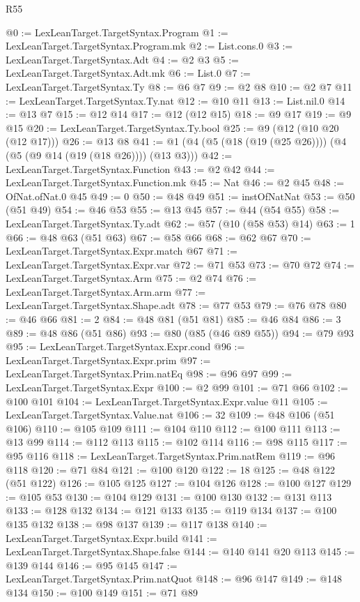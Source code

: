 \begin{lexlean}{R55}
\begin{coremodule}
@0 := LexLeanTarget.TargetSyntax.Program
@1 := LexLeanTarget.TargetSyntax.Program.mk
@2 := List.cons.{0}
@3 := LexLeanTarget.TargetSyntax.Adt
@4 := @2 @3
@5 := LexLeanTarget.TargetSyntax.Adt.mk
@6 := List.{0}
@7 := LexLeanTarget.TargetSyntax.Ty
@8 := @6 @7
@9 := @2 @8
@10 := @2 @7
@11 := LexLeanTarget.TargetSyntax.Ty.nat
@12 := @10 @11
@13 := List.nil.{0}
@14 := @13 @7
@15 := @12 @14
@17 := @12 (@12 @15)
@18 := @9 @17
@19 := @9 @15
@20 := LexLeanTarget.TargetSyntax.Ty.bool
@25 := @9 (@12 (@10 @20 (@12 @17)))
@26 := @13 @8
@41 := @1 (@4 (@5 (@18 (@19 (@25 @26)))) (@4 (@5 (@9 @14 (@19 (@18 @26)))) (@13 @3)))
@42 := LexLeanTarget.TargetSyntax.Function
@43 := @2 @42
@44 := LexLeanTarget.TargetSyntax.Function.mk
@45 := Nat
@46 := @2 @45
@48 := OfNat.ofNat.{0} @45
@49 := 0
@50 := @48 @49
@51 := instOfNatNat
@53 := @50 (@51 @49)
@54 := @46 @53
@55 := @13 @45
@57 := @44 (@54 @55)
@58 := LexLeanTarget.TargetSyntax.Ty.adt
@62 := @57 (@10 (@58 @53) @14)
@63 := 1
@66 := @48 @63 (@51 @63)
@67 := @58 @66
@68 := @62 @67
@70 := LexLeanTarget.TargetSyntax.Expr.match @67
@71 := LexLeanTarget.TargetSyntax.Expr.var
@72 := @71 @53
@73 := @70 @72
@74 := LexLeanTarget.TargetSyntax.Arm
@75 := @2 @74
@76 := LexLeanTarget.TargetSyntax.Arm.arm
@77 := LexLeanTarget.TargetSyntax.Shape.adt
@78 := @77 @53
@79 := @76 @78
@80 := @46 @66
@81 := 2
@84 := @48 @81 (@51 @81)
@85 := @46 @84
@86 := 3
@89 := @48 @86 (@51 @86)
@93 := @80 (@85 (@46 @89 @55))
@94 := @79 @93
@95 := LexLeanTarget.TargetSyntax.Expr.cond
@96 := LexLeanTarget.TargetSyntax.Expr.prim
@97 := LexLeanTarget.TargetSyntax.Prim.natEq
@98 := @96 @97
@99 := LexLeanTarget.TargetSyntax.Expr
@100 := @2 @99
@101 := @71 @66
@102 := @100 @101
@104 := LexLeanTarget.TargetSyntax.Expr.value @11
@105 := LexLeanTarget.TargetSyntax.Value.nat
@106 := 32
@109 := @48 @106 (@51 @106)
@110 := @105 @109
@111 := @104 @110
@112 := @100 @111
@113 := @13 @99
@114 := @112 @113
@115 := @102 @114
@116 := @98 @115
@117 := @95 @116
@118 := LexLeanTarget.TargetSyntax.Prim.natRem
@119 := @96 @118
@120 := @71 @84
@121 := @100 @120
@122 := 18
@125 := @48 @122 (@51 @122)
@126 := @105 @125
@127 := @104 @126
@128 := @100 @127
@129 := @105 @53
@130 := @104 @129
@131 := @100 @130
@132 := @131 @113
@133 := @128 @132
@134 := @121 @133
@135 := @119 @134
@137 := @100 @135 @132
@138 := @98 @137
@139 := @117 @138
@140 := LexLeanTarget.TargetSyntax.Expr.build
@141 := LexLeanTarget.TargetSyntax.Shape.false
@144 := @140 @141 @20 @113
@145 := @139 @144
@146 := @95 @145
@147 := LexLeanTarget.TargetSyntax.Prim.natQuot
@148 := @96 @147
@149 := @148 @134
@150 := @100 @149
@151 := @71 @89

\end{coremodule}
\end{lexlean}
